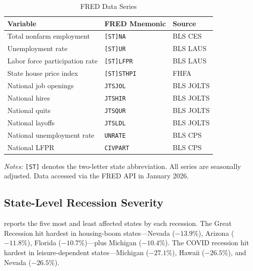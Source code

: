 \documentclass[12pt]{article}
\begin{document}
\begin{table}[H]
\centering
\caption{FRED Data Series}
\label{tab:app_fred}
\begin{threeparttable}
\small
\begin{tabular}{lll}
\toprule
Variable & FRED Mnemonic & Source \\
\midrule
Total nonfarm employment & \texttt{[ST]NA} & BLS CES \\
Unemployment rate & \texttt{[ST]UR} & BLS LAUS \\
Labor force participation rate & \texttt{[ST]LFPR} & BLS LAUS \\
State house price index & \texttt{[ST]STHPI} & FHFA \\
National job openings & \texttt{JTSJOL} & BLS JOLTS \\
National hires & \texttt{JTSHIR} & BLS JOLTS \\
National quits & \texttt{JTSQUR} & BLS JOLTS \\
National layoffs & \texttt{JTSLDL} & BLS JOLTS \\
National unemployment rate & \texttt{UNRATE} & BLS CPS \\
National LFPR & \texttt{CIVPART} & BLS CPS \\
\bottomrule
\end{tabular}
\begin{tablenotes}[flushleft]
\small
\item \textit{Notes:} \texttt{[ST]} denotes the two-letter state abbreviation. All series are seasonally adjusted. Data accessed via the FRED API in January 2026.
\end{tablenotes}
\end{threeparttable}
\end{table}

\subsection{State-Level Recession Severity}

 reports the five most and least affected states by each recession. The Great Recession hit hardest in housing-boom states---Nevada ($-13.9\%$), Arizona ($-11.8\%$), Florida ($-10.7\%$)---plus Michigan ($-10.4\%$). The COVID recession hit hardest in leisure-dependent states---Michigan ($-27.1\%$), Hawaii ($-26.5\%$), and Nevada ($-26.5\%$).
\end{document}
